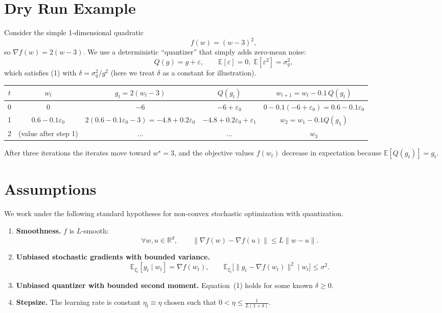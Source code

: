 \documentclass{article}
\begin{document}
\section*{Dry Run Example}
Consider the simple 1‑dimensional quadratic
\[
f(w)=(w-3)^2,
\]
so $\nabla f(w)=2(w-3)$.  We use a deterministic ``quantizer'' that simply
adds zero‑mean noise:
\[
Q(g)=g+\varepsilon,\qquad\mathbb{E}[\varepsilon]=0,\;
\mathbb{E}[\varepsilon^2]=\sigma_q^2,
\]
which satisfies (1) with $\delta=\sigma_q^2/g^2$ (here we treat $\delta$ as a
constant for illustration).

\begin{center}
\begin{tabular}{c|c|c|c|c}
$t$ & $w_t$ & $g_t=2(w_t-3)$ & $Q(g_t)$ & $w_{t+1}=w_t-0.1\,Q(g_t)$ \\ \hline
0 & $0$ & $-6$ & $-6+\varepsilon_0$ & $0-0.1(-6+\varepsilon_0)=0.6-0.1\varepsilon_0$ \\
1 & $0.6-0.1\varepsilon_0$ &
   $2(0.6-0.1\varepsilon_0-3)=-4.8+0.2\varepsilon_0$ &
   $-4.8+0.2\varepsilon_0+\varepsilon_1$ &
   $w_2= w_1-0.1Q(g_1)$ \\
2 & (value after step 1) &
   $\dots$ & $\dots$ & $w_3$ \\
\end{tabular}
\end{center}
After three iterations the iterates move toward $w^\star=3$, and the
objective values $f(w_t)$ decrease in expectation because $\mathbb{E}[Q(g_t)]=g_t$.

\section*{Assumptions}
We work under the following standard hypotheses for non‑convex stochastic
optimization with quantization.

\begin{enumerate}
\item \textbf{Smoothness.} $f$ is $L$‑smooth:
\[
\forall w,u\in\mathbb{R}^d,\qquad
\|\nabla f(w)-\nabla f(u)\|\le L\|w-u\|.
\tag{A1}
\]

\item \textbf{Unbiased stochastic gradients with bounded variance.}
\[
\mathbb{E}_{\xi_t}[g_t\mid w_t]=\nabla f(w_t),\qquad
\mathbb{E}_{\xi_t}\!\big[\|g_t-\nabla f(w_t)\|^2\mid w_t\big]\le\sigma^2.
\tag{A2}
\]

\item \textbf{Unbiased quantizer with bounded second moment.}
Equation~(1) holds for some known $\delta\ge0$.
\item \textbf{Stepsize.} The learning rate is constant $\eta_t\equiv\eta$
chosen such that $0<\eta\le\frac{1}{L(1+\delta)}$.
\end{enumerate}
\end{document}
